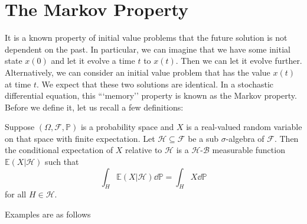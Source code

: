 \documentclass[prb,12pt]{revtex4-2}
\theoremstyle{definition}
\theoremstyle{definition}
\theoremstyle{definition}
\begin{document}
\section{The Markov Property}
It is a known property of initial value problems that the future solution is not dependent on the past. In particular, we can imagine that we have some initial state $x(0)$ and let it evolve a time $t$ to $x(t)$. Then we can let it evolve further. Alternatively, we can consider an initial value problem that has the value $x(t)$ at time $t$. We expect that these two solutions are identical. In a stochastic differential equation, this ```memory'' property is known as the Markov property. Before we define it, let us recall a few definitions:
\begin{Definition}
	Suppose $(\Omega, \mathcal{F}, \mathbb{P})$ is a probability space and $X$ is a real-valued random variable on that space with finite expectation. Let $\mathcal{H}\subseteq \mathcal{F}$ be a sub $\sigma$-algebra of $\mathcal{F}$. Then the conditional expectation of $X$ relative to $\mathcal{H}$ is a $\mathcal{H}$-$\mathcal{B}$ measurable function $\mathbb{E}(X|\mathcal{H})$ such that
	\[
		\int_H \mathbb{E}(X|\mathcal{H})\dd{\mathbb{P}}=\int_H X \dd{\mathbb{P}}
	\]
	for all $H\in \mathcal{H}$.
\end{Definition}
Examples are as follows
\begin{Example}\noindent

	\begin{center}
	\end{center}
\end{Example}


\end{document}
